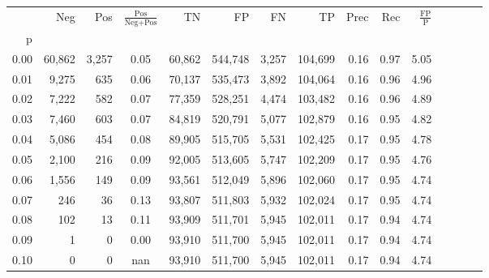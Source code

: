 \begin{tabular}{rrrcrrrrrrrrrrr}
\toprule
{} &     Neg &     Pos & $\frac{\text{Pos}}{\text{Neg}+\text{Pos}}$ &       TN &       FP &       FN &       TP &  Prec &   Rec & $\frac{\text{FP}}{\text{P}}$ \\
p    &         &         &                                            &          &          &          &          &       &       &                              \\
\midrule
0.00 &  60,862 &   3,257 &                                       0.05 &   60,862 &  544,748 &    3,257 &  104,699 &  0.16 &  0.97 &                         5.05 \\
0.01 &   9,275 &     635 &                                       0.06 &   70,137 &  535,473 &    3,892 &  104,064 &  0.16 &  0.96 &                         4.96 \\
0.02 &   7,222 &     582 &                                       0.07 &   77,359 &  528,251 &    4,474 &  103,482 &  0.16 &  0.96 &                         4.89 \\
0.03 &   7,460 &     603 &                                       0.07 &   84,819 &  520,791 &    5,077 &  102,879 &  0.16 &  0.95 &                         4.82 \\
0.04 &   5,086 &     454 &                                       0.08 &   89,905 &  515,705 &    5,531 &  102,425 &  0.17 &  0.95 &                         4.78 \\
0.05 &   2,100 &     216 &                                       0.09 &   92,005 &  513,605 &    5,747 &  102,209 &  0.17 &  0.95 &                         4.76 \\
0.06 &   1,556 &     149 &                                       0.09 &   93,561 &  512,049 &    5,896 &  102,060 &  0.17 &  0.95 &                         4.74 \\
0.07 &     246 &      36 &                                       0.13 &   93,807 &  511,803 &    5,932 &  102,024 &  0.17 &  0.95 &                         4.74 \\
0.08 &     102 &      13 &                                       0.11 &   93,909 &  511,701 &    5,945 &  102,011 &  0.17 &  0.94 &                         4.74 \\
0.09 &       1 &       0 &                                       0.00 &   93,910 &  511,700 &    5,945 &  102,011 &  0.17 &  0.94 &                         4.74 \\
0.10 &       0 &       0 &                                        nan &   93,910 &  511,700 &    5,945 &  102,011 &  0.17 &  0.94 &                         4.74 \\

\end{tabular}
